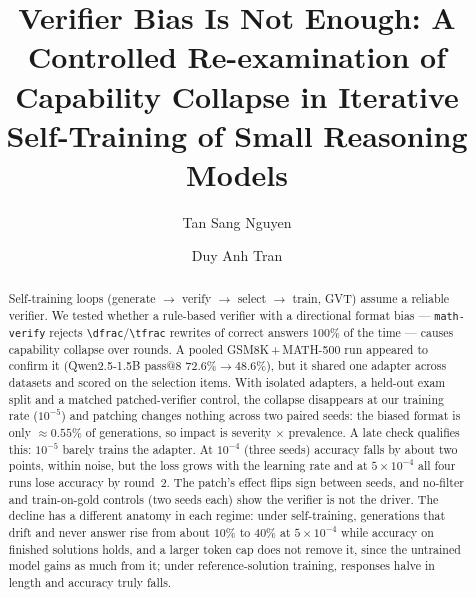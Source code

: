 \documentclass[runningheads]{llncs}
\begin{document}
\title{Verifier Bias Is Not Enough: A Controlled Re-examination of
Capability Collapse in Iterative Self-Training of Small Reasoning Models}


\author{Tan Sang Nguyen \and Duy Anh Tran}

\maketitle

\begin{abstract}
Self-training loops (generate $\rightarrow$ verify $\rightarrow$ select
$\rightarrow$ train, GVT) assume a reliable verifier. We tested whether a
rule-based verifier with a directional format bias --- \texttt{math-verify}
rejects \verb|\dfrac|/\verb|\tfrac| rewrites of correct answers $100\%$ of the
time --- causes capability collapse over rounds. A pooled GSM8K\,+\,MATH-500 run
appeared to confirm it (Qwen2.5-1.5B pass@8 $72.6\%\to48.6\%$), but it shared one
adapter across datasets and scored on the selection items. With isolated
adapters, a held-out exam split and a matched patched-verifier control, the
collapse disappears at our training rate ($10^{-5}$) and patching changes nothing
across two paired seeds: the biased format is only $\approx0.55\%$ of generations,
so impact is severity $\times$ prevalence. A late check qualifies this: $10^{-5}$
barely trains the adapter. At $10^{-4}$ (three seeds) accuracy falls by about two
points, within noise, but the loss grows with the learning rate and at
$5\times10^{-4}$ all four runs lose accuracy by round~2. The patch's effect flips
sign between seeds, and no-filter and train-on-gold controls (two seeds each) show the verifier is
not the driver. The decline has a different anatomy in each regime: under
self-training, generations that drift and never answer rise from about $10\%$ to
$40\%$ at $5\times10^{-4}$ while accuracy on finished solutions holds, and a larger
token cap does not remove it, since the untrained model gains as much from it;
under reference-solution training, responses halve in length and accuracy truly
falls.

\end{abstract}
\end{document}
